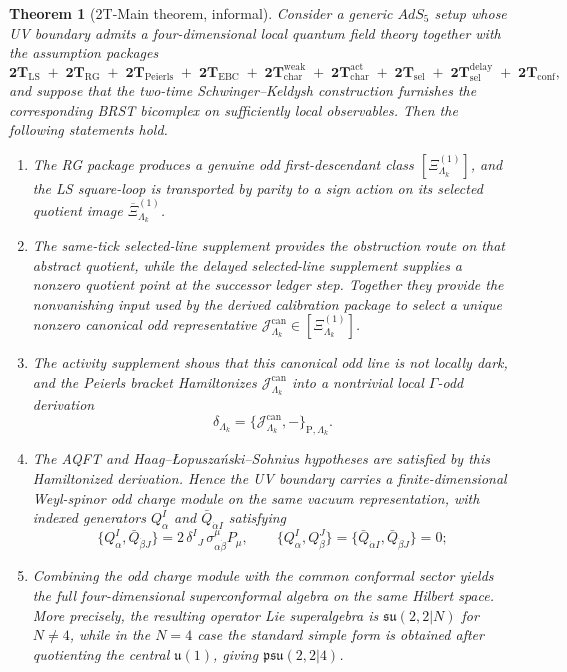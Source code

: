 \documentclass[
  aps,
  prd,
  onecolumn,
  notitlepage,
  nofootinbib,
  superscriptaddress,
  10pt
]{revtex4-2}
\theoremstyle{definition}
\theoremstyle{plain}
\newtheorem{theorem}{Theorem}[section]
\begin{document}
\begin{theorem}[2T-Main theorem, informal]
\label{thm:main}
Consider a generic \(AdS_5\) setup whose UV boundary admits a four-dimensional
local quantum field theory together with the assumption packages
\[
\mathbf{2T}_{\mathrm{LS}}
\;+\;
\mathbf{2T}_{\mathrm{RG}}
\;+\;
\mathbf{2T}_{\mathrm{Peierls}}
\;+\;
\mathbf{2T}_{\mathrm{EBC}}
\;+\;
\mathbf{2T}_{\mathrm{char}}^{\mathrm{weak}}
\;+\;
\mathbf{2T}_{\mathrm{char}}^{\mathrm{act}}
\;+\;
\mathbf{2T}_{\mathrm{sel}}
\;+\;
\mathbf{2T}_{\mathrm{sel}}^{\mathrm{delay}}
\;+\;
\mathbf{2T}_{\mathrm{conf}},
\]
and suppose that the two-time Schwinger--Keldysh construction furnishes the
corresponding BRST bicomplex on sufficiently local observables.  Then the
following statements hold.
\begin{enumerate}[label=\textnormal{(\roman*)},leftmargin=*,itemsep=0.35em]
  \item The RG package produces a genuine odd first-descendant class
  \([\Xi^{(1)}_{\Lambda_k}]\), and the LS square-loop is transported by
  parity to a sign action on its selected quotient image
  \(\overline{\Xi}^{(1)}_{\Lambda_k}\).

  \item The same-tick selected-line supplement provides the obstruction route on
  that abstract quotient, while the delayed selected-line supplement supplies a
  nonzero quotient point at the successor ledger step.  Together
  they provide the nonvanishing input used by the derived calibration package
  to select a unique nonzero canonical odd representative
  \(\mathcal J^{\mathrm{can}}_{\Lambda_k}\in[\Xi^{(1)}_{\Lambda_k}]\).

  \item The activity supplement shows that this canonical odd line is not
  locally dark, and the Peierls bracket Hamiltonizes
  \(\mathcal J^{\mathrm{can}}_{\Lambda_k}\) into a nontrivial local
  \(\Gamma\)-odd derivation
  \[
  \delta_{\Lambda_k}
  =
  \{\mathcal J^{\mathrm{can}}_{\Lambda_k},-\}_{\mathrm P,\Lambda_k}.
  \]

  \item The AQFT and Haag--\L opusza\'nski--Sohnius hypotheses are satisfied by
  this Hamiltonized derivation.  Hence the UV boundary carries a
  finite-dimensional Weyl-spinor odd charge module on the same vacuum
  representation, with indexed generators \(Q_\alpha^I\) and
  \(\bar Q_{\dot\alpha I}\) satisfying
  \[
  \{Q_\alpha^I,\bar Q_{\dot\beta J}\}
  =
  2\,\delta^I{}_J\,\sigma^\mu_{\alpha\dot\beta}P_\mu,
  \qquad
  \{Q_\alpha^I,Q_\beta^J\}
  =
  \{\bar Q_{\dot\alpha I},\bar Q_{\dot\beta J}\}=0;
  \]

  \item Combining the odd charge module with the common conformal sector yields
  the full four-dimensional superconformal algebra on the same Hilbert space.
  More precisely, the resulting operator Lie superalgebra is
  \(\mathfrak{su}(2,2|N)\) for \(N\neq4\), while in the \(N=4\) case the
  standard simple form is obtained after quotienting the central
  \(\mathfrak u(1)\), giving \(\mathfrak{psu}(2,2|4)\).
\end{enumerate}
\end{theorem}
\end{document}
